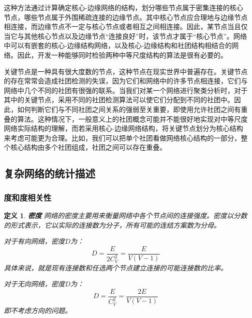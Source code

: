 \documentclass{ctexart}
\newtheorem{Definition}{\hspace{2em}定义}[section]
\begin{document}
                这种方法通过计算确定核心-边缘网络的结构，划分哪些节点属于密集连接的核心节点，哪些节点属于外围稀疏连接的边缘节点。其中核心节点应合理地与边缘节点相连接，而边缘节点不一定与核心节点或者相互之间相连接。因此，某节点当且仅当它与其他核心节点以及边缘节点“连接良好”时，该节点才属于“核心节点”。网络中可以有嵌套的核心-边缘结构网络，以及核心-边缘结构和社团结构相结合的网络。因此，开发一种能够同时检验两种中等尺度结构的算法是很有必要的。

                关键节点是一种具有很大度数的节点，这种节点在现实世界中普遍存在。关键节点的存在常常会造成社团检测的失误，因为它们和网络中的许多节点相连接，它们与网络中几个不同的社团有很强的联系。当我们对某一个网络进行聚类分析时，对于其中的关键节点，采用不同的社团检测算法可以使它们分配到不同的社团中。因此，如何判断它们与不同社团之间关系的强弱至关重要，即使用允许社团之间有重叠的算法。这种情况下，一般意义上的社团概念可能并不能很好地实现对中等尺度网络实际结构的理解，而若采用核心-边缘网络结构，将关键节点划分为核心结构来考虑可能更为合理。比如，我们可以把单个社团看做网络核心结构的一部分，整个核心结构由多个社团组成，社团之间可以存在重叠。

        \subsection{复杂网络的统计描述}
            \subsubsection{度和度相关性}
                \begin{Definition}
                    \textbf{密度} 网络的密度主要用来衡量网络中各个节点间的连接强度。密度以分数的形式表示，它以实际的连接数为分子，所有可能的连结方案数为分母。

                    对于有向网络，密度$D$为：
                    \begin{equation}
                        D = \frac{E}{2C_V^2} = \frac{E}{V(V-1)}
                    \end{equation}
                    具体来说，就是现有连接数和任选两个节点建立连接的可能连接数的比率。

                    对于无向网络，密度$D$为：
                    \begin{equation}
                        D = \frac{E}{C_V^2} = \frac{2E}{V(V-1)}
                    \end{equation}
                    即不考虑方向的问题。
                \end{Definition}
\end{document}
